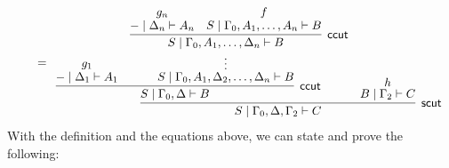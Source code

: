 \documentclass[sn-mathphys-num]{sn-jnl}%
\newcommand{\GG}{\Gamma}
\newcommand{\GD}{\Delta}
\newcommand{\vd}{\vdash}
\newcommand{\mf}[1]{\mathsf{#1}}
\theoremstyle{thmstyleone}%
\theoremstyle{thmstyletwo}%
\theoremstyle{thmstylethree}%
\begin{document}
      \begin{equation}\label{scut-or-ols}
      \begin{array}{l}
      \qquad  =
      \begin{array}{c}
        \infer[\mf{scut}]{S \mid \GG_0 , \GD , \GG_2 \vd C}{
          \infer[\mf{ccut}]{S \mid \GG_0 , \GD \vd B}{
            \deduce{{-} \mid \GD_1 \vd A_1}{g_1}
            &
            \deduce{S \mid \GG_0 , A_1 , \GD_2 , \dots , \GD_n \vd B}{
              \deduce{\vdots}{
              \infer[\mf{ccut}]{S \mid \GG_0 , A_1 , \dots , \GD_n \vd B}{
                \deduce{{-} \mid \GD_n \vd A_n}{g_n}
                &
                \deduce{S \mid \GG_0 , A_1 , \dots , A_n \vd B}{f}
              }
            }
          }
          }
          &
          \deduce{B \mid \GG_2 \vd C}{h}
        }
      \end{array}
   \end{array}
   \end{equation}
With the definition and the equations above, we can state and prove the following:
\cutIntrp
\end{document}
